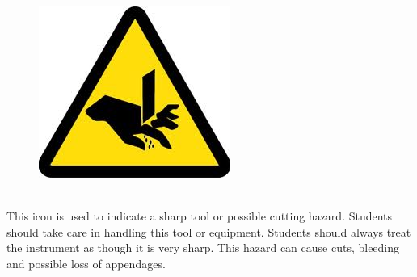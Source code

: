 \documentclass[nohyper,nobib]{tufte-book}
\begin{document}
\begin{framed}
\begin{figure}
\includegraphics[width=\linewidth]{images/cut_hazard.jpg}
\end{figure}
\ \\
This icon is used to indicate a sharp tool or possible cutting hazard.  Students should take care in handling this tool or equipment.  Students should always treat the instrument as though it is very sharp.  This hazard can cause cuts, bleeding and possible loss of appendages.  
\end{framed}
\end{document}
